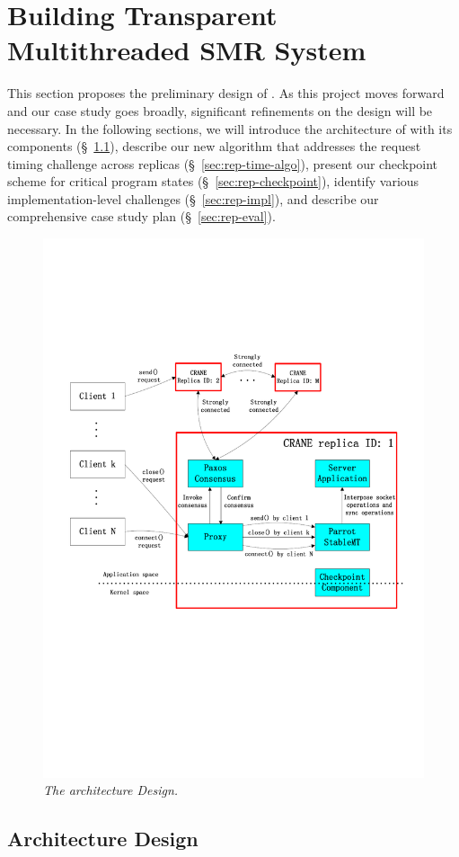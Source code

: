 \section{Building Transparent Multithreaded SMR System} \label{sec:crane-plan}

This section proposes the preliminary design of \crane. As this project moves
forward and our case study goes broadly, significant refinements on the design
will be necessary. In the following sections, we will introduce the architecture
of \crane with its components (\S~\ref{sec:rep-arch}), describe our new
algorithm that addresses the request timing challenge across replicas
(\S~\ref{sec:rep-time-algo}), present our checkpoint scheme for critical program
states (\S~\ref{sec:rep-checkpoint}), identify various implementation-level
challenges (\S~\ref{sec:rep-impl}), and describe our comprehensive case study
plan (\S~\ref{sec:rep-eval}). 

\begin{figure}[t]
\centering
\includegraphics[width=0.67\columnwidth]{figures/architecture}
\vspace{-.05in}
\caption{{\em The \crane architecture Design.}} \label{fig:arch}
\vspace{-.05in}
\end{figure}

\subsection{\crane Architecture Design} \label{sec:rep-arch}

